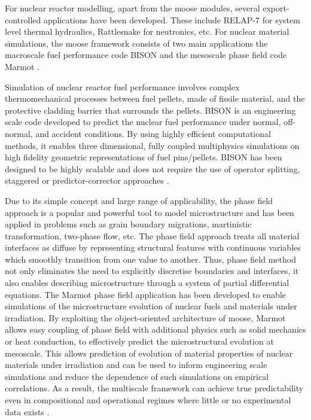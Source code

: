 	For nuclear reactor modelling, apart from the \gls{moose} modules, several export-controlled applications have been developed. These include {RELAP-7} \cite{Zhang:aa} for system level thermal hydraulics, {Rattlesnake} \cite{Wang:2021aa} for neutronics, etc. For nuclear material simulations, the {\gls{moose}} framework consists of two main applications the macroscale fuel performance code {BISON} \cite{WILLIAMSON2012149} and the mesoscale phase field code {Marmot}  \cite{Tonks12}. 
	
	Simulation of nuclear reactor fuel performance involves complex thermomechanical processes between fuel pellets, made of fissile material, and the protective cladding barrier that surrounds the pellets. {BISON} is an engineering scale code developed to predict the nuclear fuel performance under normal, off-normal, and accident conditions. By using highly efficient computational methods, it enables three dimensional, fully coupled multiphysics simulations on high fidelity geometric representations of fuel pins/pellets. {BISON} has been designed to be highly scalable and does not require the use of operator splitting, staggered or predictor-corrector approaches \cite{WILLIAMSON2012149}.

	Due to its simple concept and large range of applicability, the phase field approach is a popular and powerful tool to model microstructure and has been applied in problems such as grain boundary migrations, martinistic transformation, two-phase flow, etc. The phase field approach treats all material interfaces as diffuse by representing structural features with continuous variables which smoothly transition from one value to another. Thus, phase field method not only eliminates the need to explicitly discretise boundaries and interfaces, it also enables describing microstructure through a system of partial differential equations.  The {Marmot} phase field application has been developed to enable simulations of the microstructure evolution of nuclear fuels and materials under irradiation. By exploiting the object-oriented architecture of {\gls{moose}}, {Marmot} allows easy coupling of phase field with additional physics such as solid mechanics or heat conduction, to effectively predict the microstructural evolution at mesoscale. This allows prediction of evolution of material properties of nuclear materials under irradiation and can be used to inform engineering scale simulations and reduce the dependence of such simulations on empirical correlations. As a result, the multiscale framework can achieve true predictability even in compositional and operational regimes where little or no experimental data exists \cite{Tonks12}.

